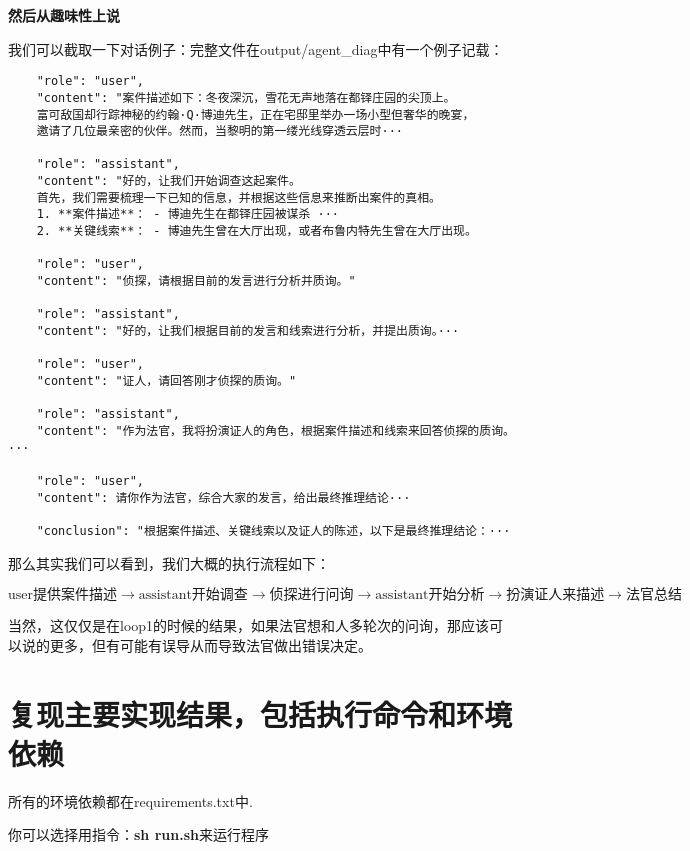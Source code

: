 \documentclass[answers]{exam}  %
\begin{document}
\textbf{然后从趣味性上说}

我们可以截取一下对话例子：完整文件在output/agent\_diag中有一个例子记载：

\begin{lstlisting}
    "role": "user",
    "content": "案件描述如下：冬夜深沉，雪花无声地落在都铎庄园的尖顶上。
    富可敌国却行踪神秘的约翰·Q·博迪先生，正在宅邸里举办一场小型但奢华的晚宴，
    邀请了几位最亲密的伙伴。然而，当黎明的第一缕光线穿透云层时···

    "role": "assistant",
    "content": "好的，让我们开始调查这起案件。
    首先，我们需要梳理一下已知的信息，并根据这些信息来推断出案件的真相。
    1. **案件描述**： - 博迪先生在都铎庄园被谋杀 ···
    2. **关键线索**： - 博迪先生曾在大厅出现，或者布鲁内特先生曾在大厅出现。

    "role": "user",
    "content": "侦探，请根据目前的发言进行分析并质询。"

    "role": "assistant",
    "content": "好的，让我们根据目前的发言和线索进行分析，并提出质询。···

    "role": "user",
    "content": "证人，请回答刚才侦探的质询。"

    "role": "assistant",
    "content": "作为法官，我将扮演证人的角色，根据案件描述和线索来回答侦探的质询。···

    "role": "user",
    "content": 请你作为法官，综合大家的发言，给出最终推理结论···

    "conclusion": "根据案件描述、关键线索以及证人的陈述，以下是最终推理结论：···
\end{lstlisting}

那么其实我们可以看到，我们大概的执行流程如下：

\begin{equation*}
    \text{user提供案件描述}\rightarrow\text{assistant开始调查}\rightarrow\text{侦探进行问询}\rightarrow\text{assistant开始分析}\rightarrow\text{扮演证人来描述}\rightarrow\text{法官总结}
\end{equation*}

当然，这仅仅是在loop1的时候的结果，如果法官想和人多轮次的问询，那应该可以说的更多，但有可能有误导从而导致法官做出错误决定。

\section{复现主要实现结果，包括执行命令和环境依赖}

所有的环境依赖都在requirements.txt中.

你可以选择用指令：\textbf{sh run.sh}来运行程序
\end{document}
